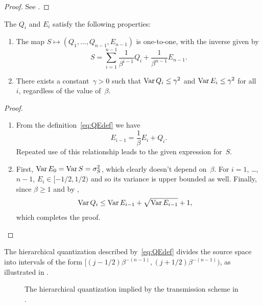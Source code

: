 \begin{proof}
  See .
\end{proof}



\begin{proposition}
  \label{prop:qeproperties}
  The $Q_i$ and $E_i$ satisfy the following properties:
\begin{enumerate}
  \item The map $S \mapsto (Q_1, \dots, Q_{n-1}, E_{n-1})$ is one-to-one, with
    the inverse given by
    \begin{equation}
      \label{eq:unwraprec}
      S = \sum_{i=1}^{n-1} \frac{1}{\beta^{i-1}} Q_i + \frac{1}{\beta^{n-1}}
      E_{n-1}.
    \end{equation}

  \item There exists a constant~$\gamma > 0$ such that $\operatorname{Var} Q_i \le \gamma^2$
    and $\operatorname{Var} E_i \le \gamma^2$ for all~$i$, regardless of the value of~$\beta$.
\end{enumerate}
\end{proposition}

\goodbreak
\begin{proof}
  \begin{enumerate}
    \item From the definition~\eqref{eq:QEdef} we have
    \begin{equation}
      \label{eq:reverserec}
      E_{i-1} = \frac{1}{\beta} E_i + Q_i.
    \end{equation}
    Repeated use of this relationship leads to the given expression for~$S$. 

  \item First, $\operatorname{Var} E_0 = \operatorname{Var} S = {\sigma_S^2}$, which clearly doesn't depend
    on~$\beta$. For $i = 1$, \ldots, $n-1$, $E_i \in [-1/2, 1/2)$ and so its
    variance is upper bounded as well. Finally, since $\beta \ge 1$ and by
    , 
    \begin{align*}
      \operatorname{Var} Q_i &\le \operatorname{Var} E_{i-1} + \sqrt{\operatorname{Var} E_{i-1}} + 1,
    \end{align*}
    which completes the proof.
  \end{enumerate}
\end{proof}

\begin{remark}
  \label{rem:scgeometry}
  The hierarchical quantization described by~\eqref{eq:QEdef} divides the source
  space into intervals of the form $[(j-1/2)\beta^{-(n-1)},
  (j+1/2)\beta^{-(n-1)})$, as illustrated in .
\end{remark}
\begin{figure}[tbp]
  \begin{center}
  \end{center}
  \caption{The hierarchical quantization implied by the transmission scheme in
  .}
  \label{fig:hierarchicalsq}
\end{figure}

